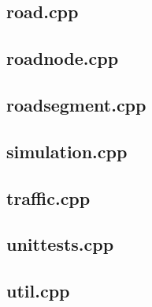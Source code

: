 \documentclass{article}
\begin{document}
  \subsection{road.cpp}
    
  \subsection{roadnode.cpp}
    
  \subsection{roadsegment.cpp}
    
  \subsection{simulation.cpp}
    
  \subsection{traffic.cpp}
    
  \subsection{unittests.cpp}
    
  \subsection{util.cpp}
    
\end{document}
